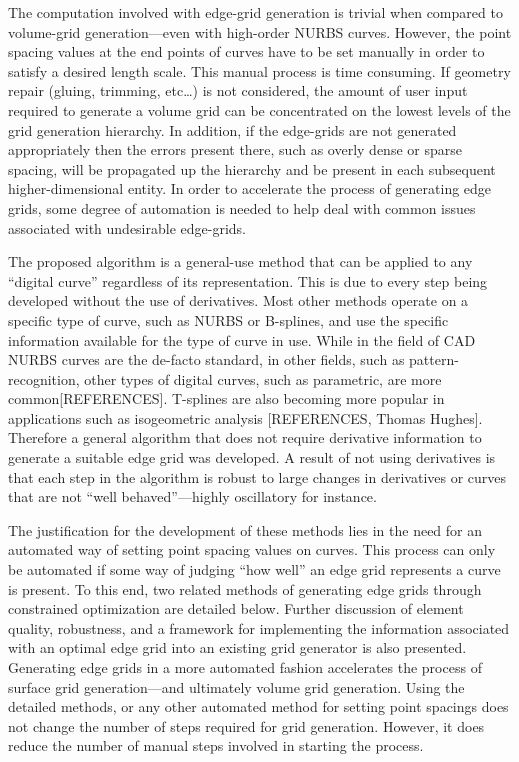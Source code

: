 \documentclass[preprint,12pt]{elsarticle}
\begin{document}
The computation involved with edge-grid generation is trivial when compared to volume-grid generation—even with high-order NURBS curves. However, the point spacing values at the end points of curves have to be set manually in order to satisfy a desired length scale. This manual process is time consuming. If geometry repair (gluing, trimming, etc…) is not considered, the amount of user input required to generate a volume grid can be concentrated on the lowest levels of the grid generation hierarchy. In addition, if the edge-grids are not generated appropriately then the errors present there, such as overly dense or sparse spacing, will be propagated up the hierarchy and be present in each subsequent higher-dimensional entity. In order to accelerate the process of generating edge grids, some degree of automation is needed to help deal with common issues associated with undesirable edge-grids.

The proposed algorithm is a general-use method that can be applied to any ``digital curve'' regardless of its representation. This is due to every step being developed without the use of derivatives. Most other methods operate on a specific type of curve, such as NURBS or B-splines, and use the specific information available for the type of curve in use. While in the field of CAD NURBS curves are the de-facto standard, in other fields, such as pattern-recognition, other types of digital curves, such as parametric, are more common[REFERENCES]. T-splines are also becoming more popular in applications such as isogeometric analysis [REFERENCES, Thomas Hughes]. Therefore a general algorithm that does not require derivative information to generate a suitable edge grid was developed. A result of not using derivatives is that each step in the algorithm is robust to large changes in derivatives or curves that are not ``well behaved''---highly oscillatory for instance.

The justification for the development of these methods lies in the need for an automated way of setting point spacing values on curves. This process can only be automated if some way of judging ``how well'' an edge grid represents a curve is present. To this end, two related methods of generating edge grids through constrained optimization are detailed below. Further discussion of element quality, robustness, and a framework for implementing the information associated with an optimal edge grid into an existing grid generator is also presented. Generating edge grids in a more automated fashion accelerates the process of surface grid generation---and ultimately volume grid generation. Using the detailed methods, or any other automated method for setting point spacings does not change the number of steps required for grid generation. However, it does reduce the number of manual steps involved in starting the process.
\end{document}
